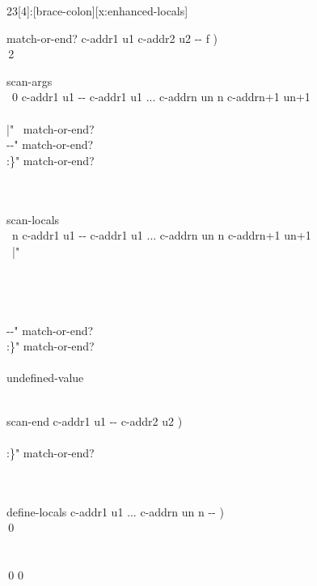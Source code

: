 \begin{worddef}[b:]{23}[4]{\brace:}[brace-colon][x:enhanced-locals]
\begin{implement}
\word{:} match-or-end?  c-addr1 u1 c-addr2 u2 -{}- f ) \\
\tab\,2        \word{;}

\word{:} scan-args \\
\tab\, 0 c-addr1 u1 -{}- c-addr1 u1 ... c-addrn un n c-addrn+1 un+1\\
\tab\, \\
\tab[2]	  |"   ~match-or-end?   \\
\tab[2]	  -{}-" match-or-end?   \\
\tab[2]	  :\}"  match-or-end?   \\
\tab[2]	   \\
\tab\,    \word{;}

\word{:} scan-locals \\
\tab\, n c-addr1 u1 -{}- c-addr1 u1 ... c-addrn un n c-addrn+1 un+1 \\
\tab\,  |"     \\
\tab[2]	 \\
\tab\, \\
\tab\,  \\
\tab\, \\
\tab[2]	  -{}-" match-or-end?   \\
\tab[2]	  :\}"  match-or-end?   \\
\tab[2]	   \\
\tab[2]	 undefined-value \\
\tab\,   \word{;}

\word{:} scan-end  c-addr1 u1 -{}- c-addr2 u2 ) \\
\tab\, \\
\tab[2]	  :\}" match-or-end?   \\
\tab[2]	  \\
\tab\, \word{;}

\word{:} define-locals  c-addr1 u1 ... c-addrn un n -{}- ) \\
\tab\,0  \\
\tab[2]	 \\
\tab\, \\
\tab\,0 0  \word{;}


\end{implement}
\end{worddef}
